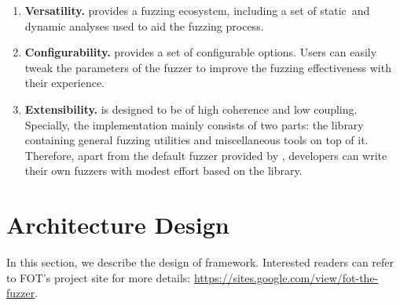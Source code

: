 \begin{enumerate}[(1)]


\item  \textbf{Versatility.}
{\FOT} provides a fuzzing ecosystem, including a set of static~and dynamic analyses used to aid the fuzzing process.


\item \textbf{Configurability.}
{\FOT} provides a set of configurable options.
Users can easily tweak the parameters of the fuzzer to improve the fuzzing effectiveness with their experience.

\item \textbf{Extensibility.}
{\FOT} is designed to be of high coherence and low coupling. Specially, the implementation mainly consists of two parts: the library containing general fuzzing utilities and miscellaneous tools on top of it. Therefore, apart from the default fuzzer provided by {\FOT}, developers can write their own fuzzers with modest effort based on the library.
\end{enumerate}







 

\section{Architecture Design}\label{sec:details}

In this section, we describe the design of {\FOT} framework.
Interested readers can refer to {FOT}'s project site for more details:
\url{https://sites.google.com/view/fot-the-fuzzer}.


